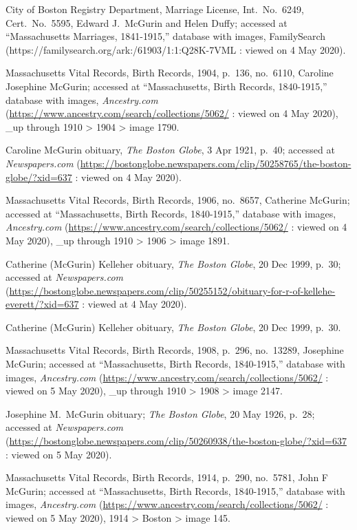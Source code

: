 \begin{thebibliography}{999}
City of Boston Registry Department, Marriage License, Int.\ No.\ 6249, Cert.\ No.\ 5595, Edward J.\ McGurin and Helen Duffy; accessed at ``Massachusetts Marriages, 1841-1915,'' database with images, FamilySearch (https://familysearch.org/ark:/61903/1:1:Q28K-7VML : viewed on 4 May 2020).

Massachusetts Vital Records, Birth Records, 1904, p.\ 136, no.\ 6110, Caroline Josephine McGurin; accessed at ``Massachusetts, Birth Records, 1840-1915,'' database with images, \textit{Ancestry.com} (\url{https://www.ancestry.com/search/collections/5062/} : viewed on 4 May 2020), \_up through 1910 > 1904 > image 1790.

Caroline McGurin obituary, \textit{The Boston Globe}, 3 Apr 1921, p.\ 40; accessed at \textit{Newspapers.com} (\url{https://bostonglobe.newspapers.com/clip/50258765/the-boston-globe/?xid=637} : viewed on 4 May 2020).

Massachusetts Vital Records, Birth Records, 1906, no.\ 8657, Catherine McGurin; accessed at ``Massachusetts, Birth Records, 1840-1915,'' database with images, \textit{Ancestry.com} (\url{https://www.ancestry.com/search/collections/5062/} : viewed on 4 May 2020), \_up through 1910 > 1906 > image 1891.

Catherine (McGurin) Kelleher obituary, \textit{The Boston Globe}, 20 Dec 1999, p.\ 30; accessed at \textit{Newspapers.com} (\url{https://bostonglobe.newspapers.com/clip/50255152/obituary-for-r-of-kellehe-everett/?xid=637} : viewed at 4 May 2020).

Catherine (McGurin) Kelleher obituary, \textit{The Boston Globe}, 20 Dec 1999, p.\ 30.

Massachusetts Vital Records, Birth Records, 1908, p.\ 296, no.\ 13289, Josephine McGurin; accessed at ``Massachusetts, Birth Records, 1840-1915,'' database with images, \textit{Ancestry.com} (\url{https://www.ancestry.com/search/collections/5062/} : viewed on 5 May 2020), \_up through 1910 > 1908 > image 2147.

Josephine M.\ McGurin obituary; \textit{The Boston Globe}, 20 May 1926, p.\ 28; accessed at \textit{Newspapers.com} (\url{https://bostonglobe.newspapers.com/clip/50260938/the-boston-globe/?xid=637} : viewed on 5 May 2020).

Massachusetts Vital Records, Birth Records, 1914, p.\ 290, no.\ 5781, John F McGurin; accessed at ``Massachusetts, Birth Records, 1840-1915,'' database with images, \textit{Ancestry.com} (\url{https://www.ancestry.com/search/collections/5062/} : viewed on 5 May 2020), 1914 > Boston > image 145.


\end{thebibliography}
